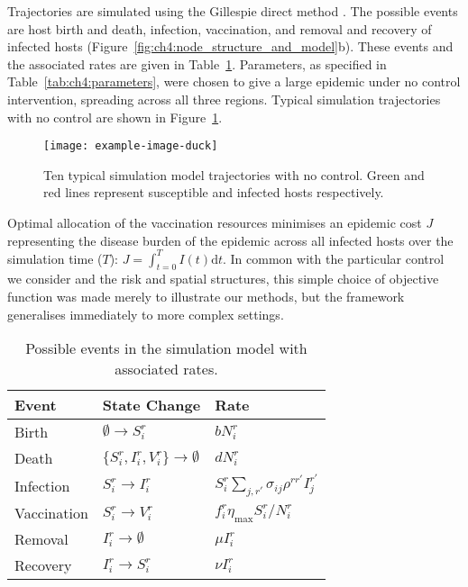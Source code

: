 Trajectories are simulated using the Gillespie direct method \citep{gillespie_exact_1977}. The possible events are host birth and death, infection, vaccination, and removal and recovery of infected hosts (Figure~\ref{fig:ch4:node_structure_and_model}b). These events and the associated rates are given in Table~\ref{tab:ch4:rates}. Parameters, as specified in Table~\ref{tab:ch4:parameters}, were chosen to give a large epidemic under no control intervention, spreading across all three regions. Typical simulation trajectories with no control are shown in Figure~\ref{fig:ch4:no_control_dpc}.

\begin{figure}[htb]
    \begin{center}
        \texttt{[image: example-image-duck]}%
        \caption{Ten typical simulation model trajectories with no control. Green and red lines represent susceptible and infected hosts respectively.}
        \label{fig:ch4:no_control_dpc}
    \end{center}
\end{figure}

Optimal allocation of the vaccination resources minimises an epidemic cost $J$ representing the disease burden of the epidemic across all infected hosts over the simulation time ($T$): $J = \int_{t=0}^TI(t)\mathrm{d}t$. In common with the particular control we consider and the risk and spatial structures, this simple choice of objective function was made merely to illustrate our methods, but the framework generalises immediately to more complex settings.

\begin{table}[htb]
    \begin{center}
    \begin{tabular}{@{}lll@{}}
        \toprule
        \textbf{Event} & \textbf{State Change} & \textbf{Rate} \\
        \midrule
        Birth & $\emptyset \rightarrow S_i^r$ & $bN_i^r$\\
        Death & $\{S_i^r,I_i^r,V_i^r\} \rightarrow \emptyset$ & $dN_i^r$ \\
        Infection & $S_i^r \rightarrow I_i^r$ & $S_i^r\sum_{j,r'}\sigma_{ij}\rho^{rr'}I_j^{r'}$\\
        Vaccination & $S_i^r \rightarrow V_i^r$ & $f_i^r\eta_{\textrm{max}}S_i^r / N_i^r$\\
        Removal & $I_i^r \rightarrow \emptyset$ & $\mu{}I_i^r$\\
        Recovery & $I_i^r \rightarrow S_i^r$ & $\nu{}I_i^r$\\
        \bottomrule
    \end{tabular}
    \caption{Possible events in the simulation model with associated rates.}
    \label{tab:ch4:rates}
    \end{center}
\end{table}
        

